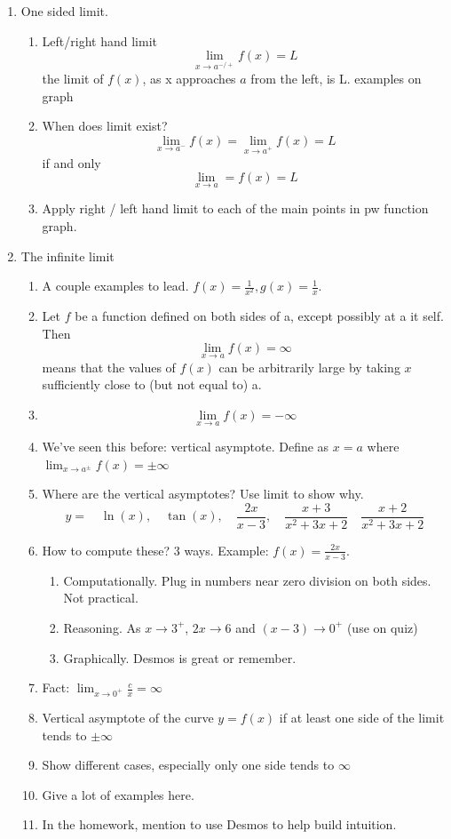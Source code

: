 \documentclass{article}
\begin{document}
\begin{enumerate}
\item One sided limit.
\begin{enumerate}
\item Left/right hand limit 
$$
\lim_{x\rightarrow a^{-/+}} f(x) = L
$$
the limit of $f(x)$, as x approaches $a$ from the left, is L. examples on graph
\item When does limit exist? 
$$
\lim_{x\rightarrow a^{-}} f(x) = \lim_{x\rightarrow a^{+}} f(x) = L
$$
if and only
$$
\lim_{x\rightarrow a} = f(x) = L
$$
\item Apply right / left hand limit to each of the main points in pw function graph.
\end{enumerate}

\item The infinite limit
\begin{enumerate}
\item A couple examples to lead. $f(x) = \frac{1}{x^2}, g(x) = \frac{1}{x}$.
\item Let $f$ be a function defined on both sides of a, except possibly at a it self. Then
$$
\lim_{x\rightarrow a} f(x) = \infty
$$
means that the values of $f(x)$ can be arbitrarily large by taking $x$ sufficiently close to (but not equal to) a.
\item $$ \lim_{x\rightarrow a} f(x) = -\infty $$
\item We've seen this before: vertical asymptote. Define as $x=a$ where $\lim_{x\rightarrow a^{\pm}} f(x) = \pm \infty$
\item  Where are the vertical asymptotes? Use limit to show why.
$$
y = \quad\ln(x), \quad\tan(x),\quad\frac{2x}{x-3},\quad\frac{x+3}{x^2+3x+2} \quad\frac{x+2}{x^2+3x+2} 
$$
\item How to compute these? 3 ways. Example: $f(x)=\frac{2x}{x-3}$.
\begin{enumerate}
\item Computationally. Plug in numbers near zero division on both sides. Not practical.
\item Reasoning. As $x\rightarrow 3^+$, $2x \rightarrow 6$ and $(x-3)\rightarrow 0^+$ (use on quiz)
\item Graphically. Desmos is great or remember.
\end{enumerate}
\item  Fact: $\lim_{x\rightarrow 0^+}\frac{c}{x} = \infty$
\item  Vertical asymptote of the curve $y = f(x)$ if at least one side of the limit tends to $\pm\infty$
\item Show different cases, especially only one side tends to $\infty$
\item Give a lot of examples here.
\item In the homework, mention to use Desmos to help build intuition.
\end{enumerate}
\end{enumerate}
\end{document}
